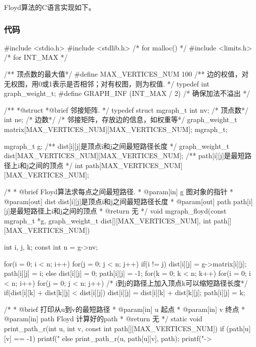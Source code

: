 Floyd算法的C语言实现如下。

\subsubsection{代码}

\begin{Codex}[label=mgraph_floyd.c]
#include <stdio.h>
#include <stdlib.h>  /* for malloc() */
#include <limits.h>  /* for INT_MAX */

/** 顶点数的最大值*/
#define MAX_VERTICES_NUM 100
/** 边的权值，对无权图，用0或1表示是否相邻；对有权图，则为权值. */
typedef int graph_weight_t;
#define GRAPH_INF (INT_MAX / 2)   /* 确保加法不溢出 */

/**
 *@struct
 *@brief 邻接矩阵.
 */
typedef struct mgraph_t {
    int nv; /* 顶点数*/
    int ne; /* 边数*/
    /* 邻接矩阵，存放边的信息，如权重等*/
    graph_weight_t matrix[MAX_VERTICES_NUM][MAX_VERTICES_NUM];
} mgraph_t;


mgraph_t g;
/** dist[i][j]是顶点i和j之间最短路径长度 */
graph_weight_t dist[MAX_VERTICES_NUM][MAX_VERTICES_NUM];
/** path[i][j]是最短路径上i和j之间的顶点 */
int path[MAX_VERTICES_NUM][MAX_VERTICES_NUM];


/*
  * @brief Floyd算法求每点之间最短路径.
  * @param[in] g 图对象的指针
  * @param[out] dist dist[i][j]是顶点i和j之间最短路径长度
  * @param[out] path path[i][j]是最短路径上i和j之间的顶点
  * @return 无
  */
void mgraph_floyd(const mgraph_t *g,
       graph_weight_t dist[][MAX_VERTICES_NUM],
       int path[][MAX_VERTICES_NUM]) {
    int i, j, k;
    const int n = g->nv;

    for(i = 0; i < n; i++) {
        for(j = 0; j < n; j++) {
            if(i != j) {
                dist[i][j] = g->matrix[i][j];
                path[i][j] = i;
            } else {
                dist[i][j] = 0;
                path[i][j] = -1;
            }
        }
    }
    for(k = 0; k < n; k++) {
        for(i = 0; i < n; i++) {
            for(j = 0; j < n; j++) {
                /* i到j的路径上加入顶点k可以缩短路径长度*/
                if(dist[i][k] + dist[k][j] < dist[i][j]) {
                    dist[i][j] = dist[i][k] + dist[k][j];
                    path[i][j] = k;
                }
            }
        }
    }
}

/*
 * @brief 打印从u到v的最短路径
 * @param[in] u 起点
 * @param[in] v 终点
 * @param[in] path Floyd 计算好的path
 * @return 无
 */
static void print_path_r(int u, int v, const int path[][MAX_VERTICES_NUM]) {
    if (path[u][v] == -1) {
        printf("%
    } else {
        print_path_r(u, path[u][v], path);
        printf("->%
    }
}


\end{Codex}
